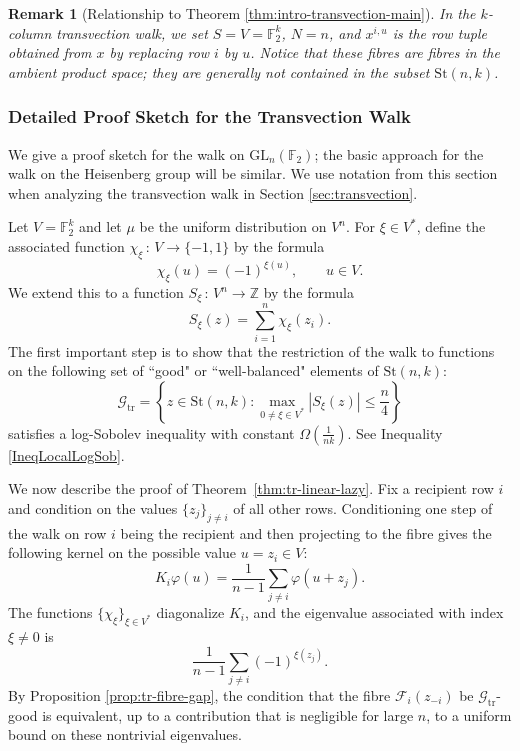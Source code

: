 \documentclass[11pt, reqno]{amsart}
\numberwithin{equation}{section}
\newtheorem{remark}[theorem]{Remark}
\newcommand{\Ft}{\mathbb F_2}
\newcommand{\Stief}[2]{\mathrm{St}(#1,#2)}
\newcommand{\GLn}{\mathrm{GL}_n(\Ft)}
\newcommand{\Good}{\mathcal G}
\begin{document}
\begin{remark} [Relationship to Theorem \ref{thm:intro-transvection-main}]
 In the \(k\)-column transvection walk, we set \(S=V=\mathbb F_2^k\), \(N=n\),
and \(x^{i,u}\) is the row tuple obtained from \(x\) by replacing row \(i\)
by \(u\). Notice that these fibres are fibres in the ambient product space; they are generally not contained in the subset \(\Stief{n}{k}\).
\end{remark}

\subsubsection{Detailed Proof Sketch for the Transvection Walk}
We give a proof sketch for the walk on \(\GLn\); the basic approach for the walk on the Heisenberg group will be similar. We use notation from this section when analyzing the transvection walk in Section \ref{sec:transvection}.


Let \(V=\Ft^k\) and let $\mu$ be the uniform distribution on $V^{n}$. For \(\xi\in V^*\), define the associated function $\chi_\xi \, : \, V \to \{-1,1\}$ by the formula
\[
\chi_\xi(u)=(-1)^{\xi(u)}, \qquad u\in V.
\]
We extend this to a function $S_\xi \, : \, V^{n} \to \mathbb{Z}$ by the formula
\[
S_\xi(z)=\sum_{i=1}^n \chi_\xi(z_i).
\]
The first important step is to show that the restriction of the walk to functions on the
following set of ``good" or ``well-balanced" elements of  \(\Stief{n}{k}\):
\begin{equation} \label{DefSketchFourierGood}
\Good_{\mathrm{tr}}
=\left\{z\in\Stief{n}{k}:\max_{0\ne\xi\in V^*}|S_\xi(z)|\le\frac n4\right\}
\end{equation}
satisfies a log-Sobolev inequality with constant $\Omega (\frac{1}{nk})$. See Inequality \eqref{IneqLocalLogSob}.


We now describe the proof of Theorem~\ref{thm:tr-linear-lazy}. Fix a recipient row \(i\) and condition on the values $\{z_{j}\}_{j \neq i}$ of all
other rows. Conditioning one step of the walk on row \(i\) being the recipient and then projecting to the fibre gives the following kernel on the possible value \(u=z_i\in V\):
\[
    K_i\varphi(u)=\frac1{n-1}\sum_{j\ne i}\varphi(u+z_j).
\]
The functions \( \{ \chi_\xi \}_{\xi\in V^*}\) diagonalize \(K_i\), and the eigenvalue associated with index \(\xi\ne0\) is
\[
    \frac1{n-1}\sum_{j\ne i}(-1)^{\xi(z_j)}.
\]
By Proposition \ref{prop:tr-fibre-gap}, the condition that the fibre $\mathcal F_i(z_{-i})$ be \(\Good_{\mathrm{tr}}\)-good is equivalent, up to a contribution that is negligible for large $n$, to a uniform bound on these nontrivial eigenvalues.
\end{document}
